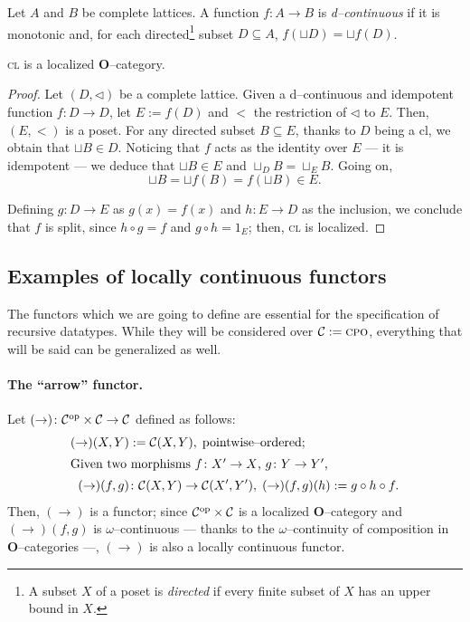 \begin{dfn}
  Let \(A\) and \(B\) be complete lattices.
  A function \(f \colon A \to B\) is \emph{d--continuous} %
 if it is monotonic and, for each directed\footnote{A subset \(X\) of a poset is \emph{directed} if every finite subset of \(X\) has an upper bound in \(X\).} subset \(D \subseteq A\),
 \(f(\sqcup D) = \sqcup f(D)\).
\end{dfn}

\begin{prp}
  \textsc{cl} is a localized \(\mathbf{O}\)--category.
\end{prp}
\begin{proof}
  Let \((D, \lhd)\) be a complete lattice.
  Given a d--continuous and idempotent function \(f \colon D \to D\), let \(E := f(D)\) and \(<\) the restriction of \(\lhd\) to \(E\). %
  Then, \((E,<)\) is a poset. For any directed subset \(B \subseteq E\), thanks to \(D\) being a cl, we obtain that \(\sqcup B \in D\).
  Noticing that \(f\) acts as the identity over \(E\) --- it is idempotent --- %
  we deduce that \(\sqcup B \in E\) and \(\sqcup_D B = \sqcup_E B\). %
  Going on,
  \begin{equation*}
    \sqcup B = \sqcup f(B) = f(\sqcup B) \in E.
  \end{equation*}

  Defining \(g \colon D \to E\) as \(g(x) = f(x)\) and \(h \colon E \to D\) as the inclusion, we conclude that \(f\) is split, since \(h \circ g = f\) and \(g \circ h = 1_E\); then, \textsc{cl} is localized.
\end{proof}

\subsection{Examples of locally continuous functors}

The functors which we are going to define are essential for the specification of recursive datatypes. While they will be considered over \(\mathcal{C} := \mathrm{\textsc{cpo}}\), everything that will be said can be generalized as well.

\paragraph{The ``arrow'' functor.}
Let \((\rightarrow) \colon \mathcal{C}^\textup{op} \times \mathcal{C} \to \mathcal{C}\) defined as follows:
\begin{align*}
    (\rightarrow)(X,Y) &:= \mathcal{C}(X,Y),\;\text{pointwise--ordered;}\\
    \intertext{Given two morphisms \(f \colon X' \to X\), \(g \colon Y \to Y'\),}
    (\rightarrow)(f,g) &\colon
      \mathcal{C}(X,Y) \to \mathcal{C}(X',Y'), \;
      (\rightarrow)(f,g)(h) := g \circ h \circ f.
\end{align*}
Then, \((\rightarrow)\) is a functor; since \(\mathcal{C}^\textup{op} \times \mathcal{C}\) is a localized \(\mathbf{O}\)--category and \((\rightarrow)(f,g)\) is \(\omega\)--continuous --- thanks to the \(\omega\)--continuity of composition in \(\mathbf{O}\)--categories ---, \((\rightarrow)\) is also a locally continuous functor. %

